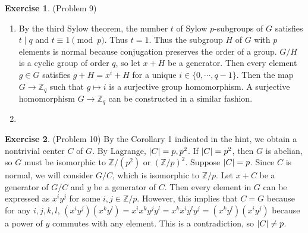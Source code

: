 \documentclass[12pt, psamsfonts]{amsart}
\theoremstyle{definition}
\newtheorem*{exer}{Exercise}
\theoremstyle{remark}
\numberwithin{equation}{section}
\begin{document}
\begin{exer}{(Problem 9)}
  \begin{enumerate}
    \item
      By the third Sylow theorem, the number $t$ of Sylow $p$-subgroups of $G$ satisfies $t \mid q$ and $t \equiv 1 \pmod p$.
      Thus $t = 1$.
      Thus the subgroup $H$ of $G$ with $p$ elements is normal because conjugation preserves the order of a group.
      $G / H$ is a cyclic group of order $q$, so let $x + H$ be a generator.
      Then every element $g \in G$ satisfies $g + H = x^i + H$ for a unique $i \in \{ 0, \cdots, q - 1 \}$.
      Then the map $G \rightarrow \mathbb{Z}_{q}$ such that $g \mapsto i$ is a surjective group homomorphism.
      A surjective homomorphism $G \rightarrow \mathbb{Z}_q$ can be constructed in a similar fashion.
    \item
      \todo[inline,caption={}]{
      }
  \end{enumerate}
\end{exer}

\begin{exer}{(Problem 10)}
  By the Corollary 1 indicated in the hint, we obtain a nontrivial center $C$ of $G$.
  By Lagrange, $\abs{C} = p, p^2$.
  If $\abs{C} = p^2$, then $G$ is abelian, so $G$ must be isomorphic to $\mathbb{Z} / (p^2)$ or $(\mathbb{Z} / p)^2$.
  Suppose $\abs{C} = p$.
  Since $C$ is normal, we will consider $G / C$, which is isomorphic to $\mathbb{Z} / p$.
  Let $x + C$ be a generator of $G / C$ and $y$ be a generator of $C$.
  Then every element in $G$ can be expressed as $x^iy^j$ for some $i, j \in \mathbb{Z}/p$.
  However, this implies that $C = G$ because for any $i, j, k, l$, $(x^iy^j)(x^ky^l) = x^ix^ky^jy^l = x^kx^iy^ly^j = (x^ky^l)(x^iy^j)$ because a power of $y$ commutes with any element.
  This is a contradiction, so $\abs{C} \ne p$.
\end{exer}
\end{document}
